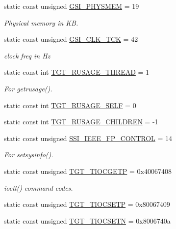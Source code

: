 \begin{Indent}{\bf }
\begin{DoxyCompactItemize}
static const unsigned \hyperlink{classAlphaTru64_a2c859016d59653914527bcd85a154da4}{GSI\_\-PHYSMEM} = 19
\begin{DoxyCompactList}\small\item\em Physical memory in KB. \item\end{DoxyCompactList}\item 
static const unsigned \hyperlink{classAlphaTru64_a26c255cf18ca324c7c09a629e9e2a4f0}{GSI\_\-CLK\_\-TCK} = 42
\begin{DoxyCompactList}\small\item\em clock freq in Hz \item\end{DoxyCompactList}\item 
static const int \hyperlink{classAlphaTru64_af35ba23c7e13a2929bc932a00b2f5c91}{TGT\_\-RUSAGE\_\-THREAD} = 1
\begin{DoxyCompactList}\small\item\em For getrusage(). \item\end{DoxyCompactList}\item 
static const int \hyperlink{classAlphaTru64_a9e303b6c52672934210e6db497f0da88}{TGT\_\-RUSAGE\_\-SELF} = 0
\item 
static const int \hyperlink{classAlphaTru64_a9a340e7463be441b8aeb8ea0a109e1bc}{TGT\_\-RUSAGE\_\-CHILDREN} = -\/1
\item 
static const unsigned \hyperlink{classAlphaTru64_a4dea1885b08c38c78286ecd5ffd5488d}{SSI\_\-IEEE\_\-FP\_\-CONTROL} = 14
\begin{DoxyCompactList}\small\item\em For setsysinfo(). \item\end{DoxyCompactList}\item 
static const unsigned \hyperlink{classAlphaTru64_a90fcc56bd4aa74a5d86c87bfeae77625}{TGT\_\-TIOCGETP} = 0x40067408
\begin{DoxyCompactList}\small\item\em ioctl() command codes. \item\end{DoxyCompactList}\item 
static const unsigned \hyperlink{classAlphaTru64_a194059e48b091a80833c40b500e70bec}{TGT\_\-TIOCSETP} = 0x80067409
\item 
static const unsigned \hyperlink{classAlphaTru64_a6783bea53088dc89157c39a9a7c71988}{TGT\_\-TIOCSETN} = 0x8006740a
\item 

\end{DoxyCompactItemize}
\end{Indent}

